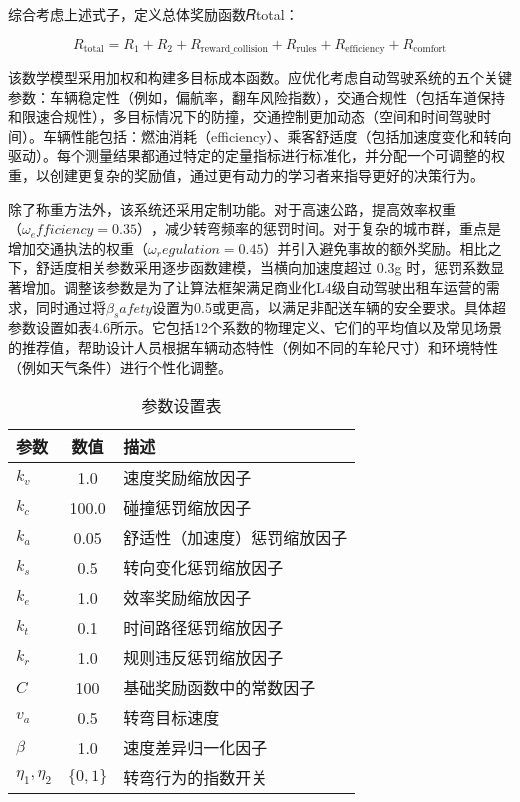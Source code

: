 综合考虑上述式子，定义总体奖励函数𝑅total：

\begin{equation}
	R_{\text{total}} = R_1 + R_2 + R_{\text{reward\_collision}} + R_{\text{rules}} + R_{\text{efficiency}} + R_{\text{comfort}}
\end{equation}

该数学模型采用加权和构建多目标成本函数。应优化考虑自动驾驶系统的五个关键参数：车辆稳定性（例如，偏航率，翻车风险指数），交通合规性（包括车道保持和限速合规性），多目标情况下的防撞，交通控制更加动态（空间和时间驾驶时间）。车辆性能包括：燃油消耗（efficiency）、乘客舒适度（包括加速度变化和转向驱动）。每个测量结果都通过特定的定量指标进行标准化，并分配一个可调整的权重，以创建更复杂的奖励值，通过更有动力的学习者来指导更好的决策行为。

除了称重方法外，该系统还采用定制功能。对于高速公路，提高效率权重\(（ω_efficiency=0.35）\)，减少转弯频率的惩罚时间。对于复杂的城市群，重点是增加交通执法的权重\(（ω_regulation=0.45）\)并引入避免事故的额外奖励。相比之下，舒适度相关参数采用逐步函数建模，当横向加速度超过 0.3g 时，惩罚系数显著增加。调整该参数是为了让算法框架满足商业化L4级自动驾驶出租车运营的需求，同时通过将\(β_safety\)设置为0.5或更高，以满足非配送车辆的安全要求。具体超参数设置如表4.6所示。它包括12个系数的物理定义、它们的平均值以及常见场景的推荐值，帮助设计人员根据车辆动态特性（例如不同的车轮尺寸）和环境特性（例如天气条件）进行个性化调整。

\begin{table}[htbp]
	\centering
	\caption{参数设置表}
	\label{tab:parameters}
	\begin{tabular}{lcl}
		\toprule
		\textbf{参数} & \textbf{数值} & \textbf{描述} \\
		\midrule
		\( k_v \)     & 1.0     & 速度奖励缩放因子 \\
		\( k_c \)     & 100.0   & 碰撞惩罚缩放因子 \\
		\( k_a \)     & 0.05    & 舒适性（加速度）惩罚缩放因子 \\
		\( k_s \)     & 0.5     & 转向变化惩罚缩放因子 \\
		\( k_e \)     & 1.0     & 效率奖励缩放因子 \\
		\( k_t \)     & 0.1     & 时间路径惩罚缩放因子 \\
		\( k_r \)     & 1.0     & 规则违反惩罚缩放因子 \\
		\( C \)       & 100     & 基础奖励函数中的常数因子 \\
		\( v_a \)     & 0.5     & 转弯目标速度 \\
		\(\beta\)    & 1.0     & 速度差异归一化因子 \\
		\(\eta_1, \eta_2\) & \(\{0, 1\}\) & 转弯行为的指数开关 \\
		\bottomrule
	\end{tabular}
\end{table}


